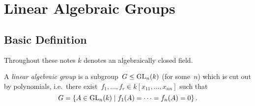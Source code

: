 \chapter{Linear Algebraic Groups}





\addtocounter{section}{-1}
\section{Basic Definition}


\begin{conventions}
  Throughout these notes $k$ denotes an algebraically closed field.
\end{conventions}


\begin{definition}
  A \emph{linear algebraic group} is a subgroup~$G \leq \operatorname{GL}_n(k)$ (for some~$n$) which is cut out by polynomials, i.e.\ there exist~$f_1, \dotsc, f_r \in k[x_{11}, \dotsc, x_{nn}]$ such that
  \[
      G
    = \{
        A \in \GL_n(k)
      \suchthat
        f_1(A) = \dotsb = f_n(A) = 0
      \} \,.
  \]
\end{definition}


